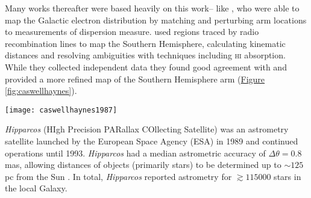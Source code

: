             Many works thereafter were based heavily on this work-- like \citet{TaylorCordes1993}, who were able to map the Galactic electron distribution by matching and perturbing arm locations to measurements of dispersion measure.
            \citet{Caswell1987} used \hii\space regions traced by radio recombination lines to map the Southern Hemisphere, calculating kinematic distances and resolving ambiguities with techniques including \textsc{hi} absorption. While they collected independent data they found good agreement with \citet{Georgelin1976} and provided a more refined map of the Southern Hemisphere arm (\hyperref[fig:caswellhaynes]{Figure \ref*{fig:caswellhaynes}}).
            \begin{SCfigure}
            	\centering
            	\texttt{[image: caswellhaynes1987]}
            	\caption[\citet{Caswell1987} Figure 5.]{Figure 5 \citet{Caswell1987}. Original caption: {\it Spiral pattern delineated by \hii\,\,regions in the Galaxy. Individual \hii\space regions from the present work are shown only if there is no distance ambiguity. Two segments of spiral arms derived from the present work are shown with a thickness 1\,kpc. \dots}.}
            	\label{fig:caswellhaynes}
          	\end{SCfigure}
            
		   
		   {\it Hipparcos} (HIgh Precision PARallax COllecting Satellite) was an astrometry satellite launched by the European Space Agency (ESA) in 1989 and continued operations until 1993. {\it Hipparcos} had a median astrometric accuracy of $\Delta\theta=0.8$\,mas, allowing distances of objects (primarily stars) to be determined up to $\sim125$\,pc from the Sun \citep[to 10\% uncertainty; ][]{Perryman1997}. In total, {\it Hipparcos} reported astrometry for $\gtrsim115000$ stars in the local Galaxy.
		    	
